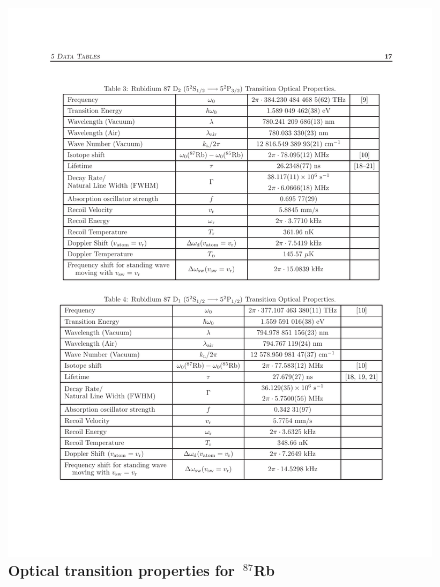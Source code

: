\begin{figure}[ht!]
		\includegraphics[width=\columnwidth]{figures/ap1/SteckTable34.pdf} 
		\caption{\textbf{Optical transition properties for $~^{87}$Rb } \cite{SteckRb} }
		\label{fig:SteckT34}	
\end{figure}

